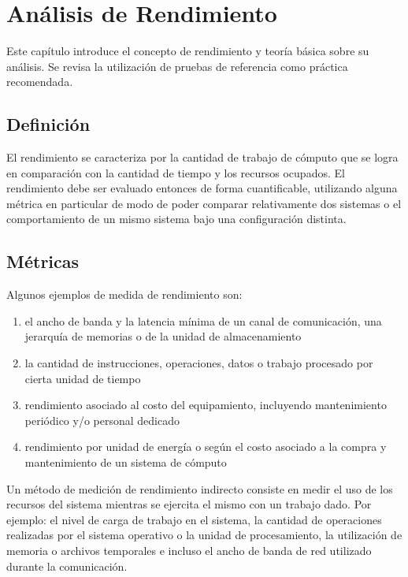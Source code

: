\documentclass[a4paper]{report}
\begin{document}
\chapter{An\'alisis de Rendimiento}

Este cap\'itulo introduce el concepto de rendimiento y teor\'ia b\'asica sobre su an\'alisis.
Se revisa la utilizaci\'on de pruebas de referencia como pr\'actica recomendada.

\section{Definici\'on}

El rendimiento se caracteriza por la cantidad de trabajo de c\'omputo que se
logra en comparaci\'on con la cantidad de tiempo y los recursos ocupados.
El rendimiento debe ser evaluado entonces de forma cuantificable, utilizando alguna
m\'etrica en particular de modo de poder comparar relativamente dos sistemas o
el comportamiento de un mismo sistema bajo una configuraci\'on distinta.

\section{M\'etricas}

Algunos ejemplos de medida de rendimiento son:

\begin{enumerate}
\item el ancho de banda y la latencia m\'inima de un canal de comunicaci\'on,
  una jerarqu\'ia de memorias o de la unidad de almacenamiento
\item la cantidad de instrucciones, operaciones, datos o trabajo procesado
  por cierta unidad de tiempo
\item rendimiento asociado al costo del equipamiento, incluyendo mantenimiento
 peri\'odico y/o personal dedicado
\item rendimiento por unidad de energ\'ia o seg\'un el costo asociado a la compra
y mantenimiento de un sistema de c\'omputo

\end{enumerate}

Un m\'etodo de medici\'on de rendimiento indirecto consiste en medir el uso de
los recursos del sistema mientras se ejercita el mismo con un trabajo dado.
Por ejemplo: el nivel de carga de trabajo en el sistema, la cantidad de operaciones realizadas por el
sistema operativo o la unidad de procesamiento, la utilizaci\'on de memoria o
archivos temporales e incluso el ancho de banda de red utilizado durante la comunicaci\'on.
\end{document}
